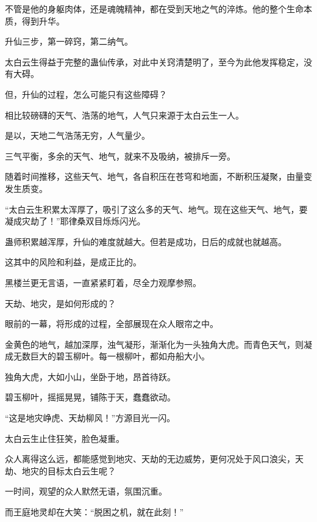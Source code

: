 \begin{this_body}
不管是他的身躯肉体，还是魂魄精神，都在受到天地之气的淬炼。他的整个生命本质，得到升华。

升仙三步，第一碎窍，第二纳气。

太白云生得益于完整的蛊仙传承，对此中关窍清楚明了，至今为此他发挥稳定，没有大碍。

但，升仙的过程，怎么可能只有这些障碍？

相比较磅礴的天气、浩荡的地气，人气只来源于太白云生一人。

是以，天地二气浩荡无穷，人气量少。

三气平衡，多余的天气、地气，就来不及吸纳，被排斥一旁。

随着时间推移，这些天气、地气，各自积压在苍穹和地面，不断积压凝聚，由量变发生质变。

“太白云生积累太浑厚了，吸引了这么多的天气、地气。现在这些天气、地气，要凝成灾劫了！”耶律桑双目烁烁闪光。

蛊师积累越浑厚，升仙的难度就越大。但若是成功，日后的成就也就越高。

这其中的风险和利益，是成正比的。

黑楼兰更无言语，一直紧紧盯着，尽全力观摩参照。

天劫、地灾，是如何形成的？

眼前的一幕，将形成的过程，全部展现在众人眼帘之中。

金黄色的地气，越加深厚，浊气凝形，渐渐化为一头独角大虎。而青色天气，则凝成无数巨大的碧玉柳叶。每一根柳叶，都如舟船大小。

独角大虎，大如小山，坐卧于地，昂首待跃。

碧玉柳叶，摇摇晃晃，铺陈于天，蠢蠢欲动。

“这是地灾峥虎、天劫柳风！”方源目光一闪。

太白云生止住狂笑，脸色凝重。

众人离得这么远，都能感觉到地灾、天劫的无边威势，更何况处于风口浪尖，天劫、地灾的目标太白云生呢？

一时间，观望的众人默然无语，氛围沉重。

而王庭地灵却在大笑：“脱困之机，就在此刻！”

\end{this_body}

